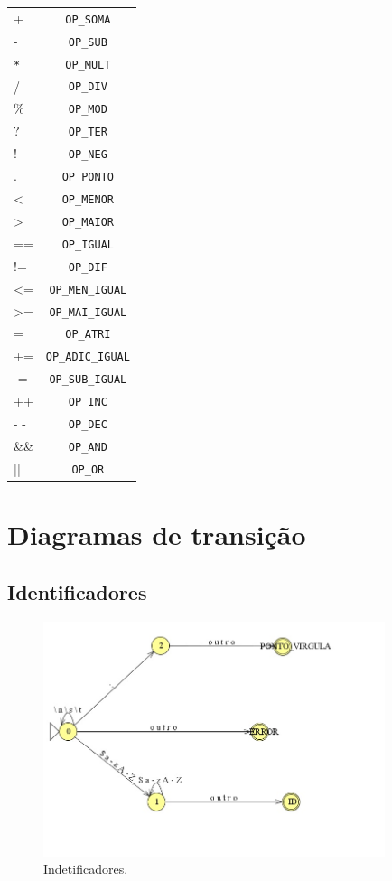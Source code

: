 \documentclass{article}
\begin{document}
\begin{tabular}{ l | c }
 + & \texttt{OP\_SOMA} \\
 - & \texttt{OP\_SUB} \\
 \texttt{*} & \texttt{OP\_MULT} \\
 / & \texttt{OP\_DIV} \\
 \% & \texttt{OP\_MOD} \\
 ? & \texttt{OP\_TER} \\
 ! & \texttt{OP\_NEG} \\
 . & \texttt{OP\_PONTO} \\
 < & \texttt{OP\_MENOR} \\
 > & \texttt{OP\_MAIOR} \\
 == & \texttt{OP\_IGUAL} \\
 != & \texttt{OP\_DIF} \\
 <= & \texttt{OP\_MEN\_IGUAL} \\
 >= & \texttt{OP\_MAI\_IGUAL} \\
 = & \texttt{OP\_ATRI} \\
 += &  \texttt{OP\_ADIC\_IGUAL} \\
 -= &  \texttt{OP\_SUB\_IGUAL} \\
 ++ &  \texttt{OP\_INC} \\
 - - &  \texttt{OP\_DEC} \\
\&\& &  \texttt{OP\_AND} \\
 || &  \texttt{OP\_OR} \\
\end{tabular}

\pagebreak

\section{Diagramas de transição}

\subsection{Identificadores}

\begin{figure}[!h]
\centering
\includegraphics[width=10cm]{DT_ID.jpg}
\caption{Indetificadores.}
\label{fig:CL_logo}\end{figure}
\end{document}
